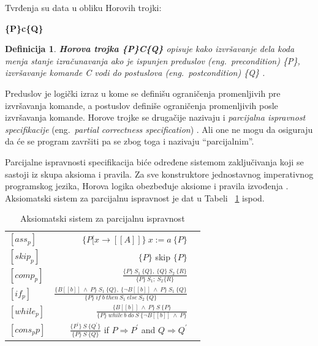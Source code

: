 \documentclass[a4paper]{article}
\newtheorem{definicija}{Definicija}[section]
\begin{document}
{\begin{tcolorbox}
Tvrđenja su data u obliku Horovih trojki:

  \center \textbf{\{P\}c\{Q\}}

\end{tcolorbox}




\begin{definicija}
\textbf{Horova trojka \{P\}C\{Q\}} opisuje kako izvršavanje dela koda menja stanje izračunavanja ako je ispunjen preduslov (eng.~{\em  precondition}) \{P\}, izvršavanje komande C vodi do postuslova (eng.~{\em  postcondition}) \{Q\} \cite{milena} .

\end{definicija}

Preduslov je logički izraz u kome se definišu ograničenja promenljivih pre izvršavanja komande, a postuslov definiše ograničenja promenljivih posle izvršavanja komande.
Horove trojke se drugačije nazivaju i \textit{parcijalna ispravnost specifikacije } (eng.~{\em  partial correctness specification}) .
Ali one ne mogu da osiguraju da će se program završiti pa se zbog toga i nazivaju “parcijalnim”.

Parcijalne ispravnosti specifikacija biće određene sistemom zaključivanja koji se sastoji iz skupa aksioma i pravila. Za sve konstruktore jednostavnog imperativnog programskog jezika, Horova logika obezbeđuje aksiome i pravila izvođenja \cite{milena}. Aksiomatski sistem za parcijalnu ispravnost je dat u Tabeli ~\ref{tab:a} ispod.


\begin{table}[h]
  \caption{Aksiomatski sistem za parcijalnu ispravnost}\label{tab:a}
    \begin{center}
        \begin{tabular}{lrc}\hline
        \hline
        \hline
        $[ass_{p}] $ & $ \{ P[x \rightarrow [\![A]\!]\} \ x:= a \ \{P\}$    \\  [6pt]
        $[skip_{p}] $ & $ \{P\}$ skip  $ \{P\}$   \\ [6pt]
         $[comp_{p}] $ & $  \frac{\{P\} \ S_1 \ \{Q\}, \ \{Q\} \ S_2 \ \{R\}}{\{P\} \ S_1; \ S_2\{R\}} $ \\[6pt]
            $[if_{p}] $ & $  \frac{\{B[\![b]\!] \ \land \ P\} \ S_1 \ \{Q\}, \ \{\neg B[\![b]\!] \ \land \ P\} \ S_1 \ \{Q\}}{\{P\} \  if \ b \ then \ S_1 \  else \ S_2 \ \{Q\}} $ \\ [6pt]
        $[while_{p}] $ & $  \frac{\{B[\![b]\!] \ \land \ P\} \ S \ \{P\}}{\{P\} \  while \ b \ do \ S \ \{\neg B[\![b]\!] \ \land \ P\}} $ \\ [6pt]
          $[cons_p{p}] $ & $  \frac{\{P^{'}\} \ S \ \{Q^{'}\}}{\{P\} \ S \ \{Q\}} $ if $ P \Rightarrow	 P^{'} $ and $ Q \Rightarrow	 Q^{'} $  \\ [6pt]
          \hline \hline
        \end{tabular}
    \end{center}
\end{table}






}
\end{document}
